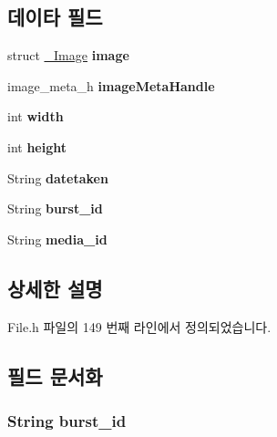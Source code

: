 \subsection*{데이타 필드}
\begin{DoxyCompactItemize}
\item 
\hypertarget{struct___image_extends_a24c96542e7d59186d5d414503928920a}{struct \hyperlink{struct___image}{\-\_\-\-Image} {\bfseries image}}\label{struct___image_extends_a24c96542e7d59186d5d414503928920a}

\item 
\hypertarget{struct___image_extends_a9cb994692e8daaf094623152f5f88d53}{image\-\_\-meta\-\_\-h {\bfseries image\-Meta\-Handle}}\label{struct___image_extends_a9cb994692e8daaf094623152f5f88d53}

\item 
\hypertarget{struct___image_extends_a2474a5474cbff19523a51eb1de01cda4}{int {\bfseries width}}\label{struct___image_extends_a2474a5474cbff19523a51eb1de01cda4}

\item 
\hypertarget{struct___image_extends_ad12fc34ce789bce6c8a05d8a17138534}{int {\bfseries height}}\label{struct___image_extends_ad12fc34ce789bce6c8a05d8a17138534}

\item 
\hypertarget{struct___image_extends_a077fc46f97fd76e21ef941afe99e6eaa}{String {\bfseries datetaken}}\label{struct___image_extends_a077fc46f97fd76e21ef941afe99e6eaa}

\item 
\hypertarget{struct___image_extends_ac42679c44413eda88288568352b90dd9}{String {\bfseries burst\-\_\-id}}\label{struct___image_extends_ac42679c44413eda88288568352b90dd9}

\item 
\hypertarget{struct___image_extends_af61699ef5054dcf075cbf29d59ed8d3c}{String {\bfseries media\-\_\-id}}\label{struct___image_extends_af61699ef5054dcf075cbf29d59ed8d3c}

\end{DoxyCompactItemize}


\subsection{상세한 설명}


File.\-h 파일의 149 번째 라인에서 정의되었습니다.



\subsection{필드 문서화}
\hypertarget{struct___image_extends_ac42679c44413eda88288568352b90dd9}{
\subsubsection[{burst\-\_\-id}]{\setlength{\rightskip}{0pt plus 5cm}String burst\-\_\-id}}\label{struct___image_extends_ac42679c44413eda88288568352b90dd9}


